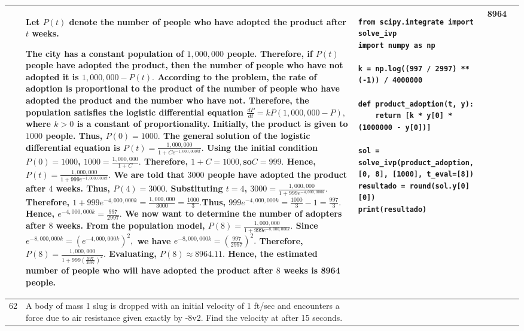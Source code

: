 \documentclass[a4paper,12pt]{article}
\begin{document}
\begin{longtable}{|p{0.3cm}|p{}|p{10cm}|p{}|p{1.5cm}|}
              &Let $P(t)$ denote the number of people who have adopted the product after $t$ weeks.

The city has a constant population of $1,000,000$ people. Therefore, if $P(t)$ people have adopted the product, then the number of people who have not adopted it is $1,000,000-P(t).$
According to the problem, the rate of adoption is proportional to the product of the number of people who have adopted the product and the number who have not. Therefore, the population satisfies the logistic differential equation $\frac{dP}{dt}=kP(1,000,000-P),$ where $k>0$ is a constant of proportionality.
Initially, the product is given to $1000$ people. Thus,  $P(0)=1000.$
The general solution of the logistic differential equation is
$P(t)=\frac{1,000,000}{1+Ce^{-1,000,000kt}}.$
Using the initial condition $P(0)=1000$, $1000=\frac{1,000,000}{1+C}.$
Therefore, $1+C=1000,$so$C=999.$
Hence, $P(t)=\frac{1,000,000}{1+999e^{-1,000,000kt}}.$
We are told that $3000$ people have adopted the product after $4$ weeks. Thus,  $P(4)=3000.$
Substituting $t=4$, $3000=\frac{1,000,000}{1+999e^{-4,000,000k}}.$
Therefore, $1+999e^{-4,000,000k}
=\frac{1,000,000}{3000}
=\frac{1000}{3}.$Thus, $999e^{-4,000,000k}
=\frac{1000}{3}-1
=\frac{997}{3}.$
Hence, $e^{-4,000,000k}
=\frac{997}{2997}.$
We now want to determine the number of adopters after $8$ weeks.
From the population model, $P(8)=\frac{1,000,000}{1+999e^{-8,000,000k}}.$
Since$e^{-8,000,000k}
=\left(e^{-4,000,000k}\right)^2,$
we have $e^{-8,000,000k}
=\left(\frac{997}{2997}\right)^2.$
Therefore, 
$P(8)=\frac{1,000,000}
{1+999\left(\frac{997}{2997}\right)^2}.$
Evaluating,
$P(8)\approx8964.11.$
Hence, the estimated number of people who will have adopted the product after $8$ weeks is 8964 people.

 &\begin{verbatim}
from scipy.integrate import solve_ivp
import numpy as np

k = np.log((997 / 2997) ** (-1)) / 4000000

def product_adoption(t, y):
    return [k * y[0] * (1000000 - y[0])]

sol = solve_ivp(product_adoption, [0, 8], [1000], t_eval=[8])
resultado = round(sol.y[0][0])
print(resultado)
\end{verbatim}& 8964 \\ \hline 
 62           & A body of mass 1 slug is dropped with an initial velocity of 1 ft/sec and encounters a force due to air resistance given exactly by -8v2. Find the velocity at after 15 seconds.



\end{longtable}
\end{document}
